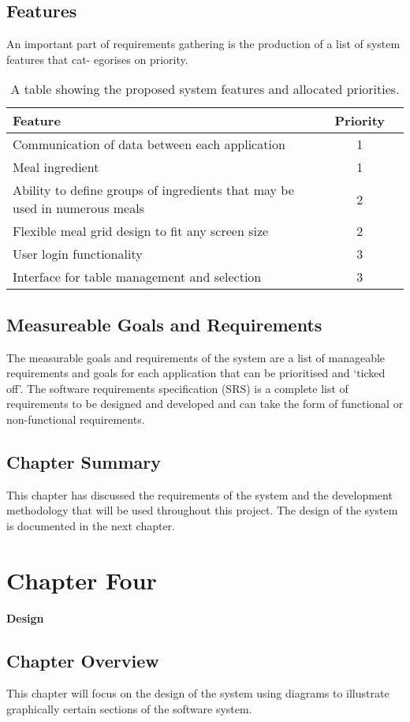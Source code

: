 \documentclass[12pt,a4paper]{article}
\begin{document}
\subsection{Features}
	\label{sec:prioty}
	An important part of requirements gathering is the production of a list of system features that cat-
egorises on priority.

	\begin{table}[H]
	\centering
	\caption{A table showing the proposed system features and allocated priorities.}
	\label{tab:fea}
	\begin{tabular}{l c r}
		\bfseries{Feature} & \bfseries{Priority}\\ \hline
		Communication of data between each application & 1\\
		Meal ingredient & 1\\ \hline
		Ability to define groups of ingredients that may be used in numerous meals & 2\\
		Flexible meal grid design to fit any screen size & 2\\ \hline
		User login functionality & 3\\
		Interface for table management and selection & 3\\
	\end{tabular}
\end{table}	
\subsection{Measureable Goals and Requirements}
	The measurable goals and requirements of the system are a list of manageable requirements and goals
for each application that can be prioritised and ‘ticked off’. The software requirements specification (SRS) is a complete list of requirements to be designed and developed and can take the form of functional
or non-functional requirements.
	
\subsection{Chapter Summary}
	This chapter has discussed the requirements of the system and the development methodology that will
be used throughout this project. The design of the system is documented in the next chapter.
\newpage
\section{Chapter Four}
{\bfseries\Large Design}
	\subsection{Chapter Overview}
	This chapter will focus on the design of the system using diagrams to illustrate graphically certain
sections of the software system.
\end{document}
